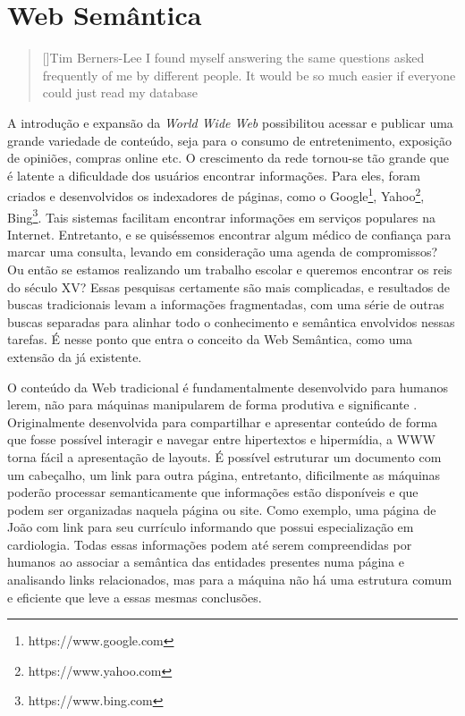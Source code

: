 \chapter{Web Semântica}
\label{cap:semantic_web}

\begin{quotation}[]{Tim Berners-Lee}
I found myself answering the same questions asked frequently of me by different people. It would be so much easier if everyone could just read my database
\end{quotation}

A introdução e expansão da \textit{World Wide Web} possibilitou acessar e publicar uma grande variedade de conteúdo, seja para o consumo de entretenimento, exposição de opiniões, compras online etc. O crescimento da rede tornou-se tão grande que é latente a dificuldade dos usuários encontrar informações. Para eles, foram criados e desenvolvidos os indexadores de páginas, como o Google\footnote{https://www.google.com}, Yahoo\footnote{https://www.yahoo.com}, Bing\footnote{https://www.bing.com}. Tais sistemas facilitam encontrar informações em serviços populares na Internet. Entretanto, e se quiséssemos encontrar algum médico de confiança para marcar uma consulta, levando em consideração uma agenda de compromissos? Ou então se estamos realizando um trabalho escolar e queremos encontrar os reis do século XV? Essas pesquisas certamente são mais complicadas, e resultados de buscas tradicionais levam a informações fragmentadas, com uma série de outras buscas separadas para alinhar todo o conhecimento e semântica envolvidos nessas tarefas. É nesse ponto que entra o conceito da Web Semântica, como uma extensão da já existente.

O conteúdo da Web tradicional é fundamentalmente desenvolvido para humanos lerem, não para máquinas manipularem de forma produtiva e significante \citep{bernerslee2001semantic}. Originalmente desenvolvida para compartilhar e apresentar conteúdo de forma que fosse possível interagir e navegar entre hipertextos e hipermídia, a \ac{WWW} torna fácil a apresentação de layouts. É possível estruturar um documento com um cabeçalho, um link para outra página, entretanto, dificilmente as máquinas poderão processar semanticamente que informações estão disponíveis e que podem ser organizadas naquela página ou site. Como exemplo, uma página de João com link para seu currículo informando que possui especialização em cardiologia. Todas essas informações podem até serem compreendidas por humanos ao associar a semântica das entidades presentes numa página e analisando links relacionados, mas para a máquina não há uma estrutura comum e eficiente que leve a essas mesmas conclusões.

